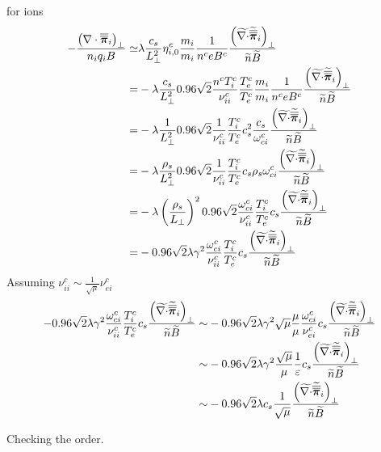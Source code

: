 %
for ions
%
\begin{align*}
    - \frac{ \left(\nabla\cdot\boldsymbol{\overline{\overline{\pi}}}_i\right)_\perp }{n_i  q_i B}
\simeq&
\lambda
\frac{c_s}{L_{\perp}^2}
\eta^c_{i,0}
\frac{m_i}{m_i}
\frac{1}{n^c  e B^c}
\frac{\left(\widetilde{ \nabla\cdot}\widetilde{ \boldsymbol{\overline{\overline{\pi}}}}_i\right)_\perp}{\widetilde{ n}\widetilde{ B}}
\\
=&
-
\lambda
\frac{c_s}{L_{\perp}^2}
0.96\sqrt{2}\frac{n^cT_i^c}{\nu^c_{ii}}
\frac{T_e^c}{T_e^c}
\frac{m_i}{m_i}
\frac{1}{n^c  e B^c}
\frac{\left(\widetilde{ \nabla\cdot}\widetilde{ \boldsymbol{\overline{\overline{\pi}}}}_i\right)_\perp}{\widetilde{ n}\widetilde{ B}}
\\
=&
-
\lambda
\frac{1}{L_{\perp}^2}
0.96\sqrt{2}\frac{1}{\nu^c_{ii}}
\frac{T_i^c}{T_e^c}
c_s^2
\frac{c_s}{\omega^c_{ci}}
\frac{\left(\widetilde{ \nabla\cdot}\widetilde{ \boldsymbol{\overline{\overline{\pi}}}}_i\right)_\perp}{\widetilde{ n}\widetilde{ B}}
\\
=&
-
\lambda
\frac{\rho_s}{L_{\perp}^2}
0.96\sqrt{2}\frac{1}{\nu^c_{ii}}
\frac{T_i^c}{T_e^c}
c_s\rho_s\omega^c_{ci}
\frac{\left(\widetilde{ \nabla\cdot}\widetilde{ \boldsymbol{\overline{\overline{\pi}}}}_i\right)_\perp}{\widetilde{ n}\widetilde{ B}}
\\
=&
-
\lambda
\left(\frac{\rho_s}{L_{\perp}}\right)^2
0.96\sqrt{2}\frac{\omega^c_{ci}}{\nu^c_{ii}}
\frac{T_i^c}{T_e^c}
c_s
\frac{\left(\widetilde{ \nabla\cdot}\widetilde{ \boldsymbol{\overline{\overline{\pi}}}}_i\right)_\perp}{\widetilde{ n}\widetilde{ B}}
\\
=&
-
0.96\sqrt{2}
\lambda
\gamma^2
\frac{\omega^c_{ci}}{\nu^c_{ii}}
\frac{T_i^c}{T_e^c}
c_s
\frac{\left(\widetilde{ \nabla\cdot}\widetilde{ \boldsymbol{\overline{\overline{\pi}}}}_i\right)_\perp}{\widetilde{ n}\widetilde{ B}}
\end{align*}
%
Assuming $\nu^c_{ii}\sim\frac{1}{\sqrt{\mu}}\nu^c_{ei}$
%
\begin{align*}
-
0.96\sqrt{2}
\lambda
\gamma^2
\frac{\omega^c_{ci}}{\nu^c_{ii}}
\frac{T_i^c}{T_e^c}
c_s
\frac{\left(\widetilde{ \nabla\cdot}\widetilde{ \boldsymbol{\overline{\overline{\pi}}}}_i\right)_\perp}{\widetilde{ n}\widetilde{ B}}
\sim&
-
0.96\sqrt{2}
\lambda
\gamma^2
\sqrt{\mu}
\frac{\mu}{\mu}
\frac{\omega^c_{ci}}{\nu^c_{ei}}
c_s
\frac{\left(\widetilde{ \nabla\cdot}\widetilde{ \boldsymbol{\overline{\overline{\pi}}}}_i\right)_\perp}{\widetilde{ n}\widetilde{ B}}
\\
\sim&
-
0.96\sqrt{2}
\lambda
\gamma^2
\frac{\sqrt{\mu}}{\mu}
\frac{1}{\varepsilon}
c_s
\frac{\left(\widetilde{ \nabla\cdot}\widetilde{ \boldsymbol{\overline{\overline{\pi}}}}_i\right)_\perp}{\widetilde{ n}\widetilde{ B}}
\\
\sim&
-
0.96\sqrt{2}
\lambda
c_s
\frac{1}{\sqrt{\mu}}
\frac{\left(\widetilde{ \nabla\cdot}\widetilde{ \boldsymbol{\overline{\overline{\pi}}}}_i\right)_\perp}{\widetilde{ n}\widetilde{ B}}
\end{align*}
%

Checking the order.

